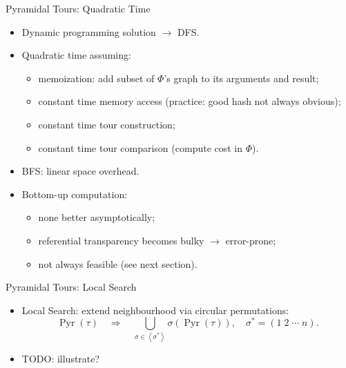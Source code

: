 \documentclass[
  size=10pt,
  style=klope,
  paper=screen,
  pauseslide,
  nopagebreaks,
  fleqn
]{powerdot}
\def\todo{\color{red}}
\def\eqitspace{\vspace{-5mm}}
\begin{document}
\begin{slide}[toc=Dynamic Programming${,}$ Recursion and Time Complexity]{Pyramidal Tours: Quadratic Time}
  \begin{itemize}
  \item
  Dynamic programming solution $\rightarrow$ DFS.
  \item
  Quadratic time assuming:
  \begin{itemize}
    \item memoization: add subset of $\Phi$'s graph to its arguments and result;
    \item constant time memory access (practice: good hash not always obvious);
    \item constant time tour construction;
    \item constant time tour comparison (compute cost in $\Phi$).
  \end{itemize}
  \item
  BFS: linear space overhead.
  \item
  Bottom-up computation:
  \begin{itemize}
    \item
    none better asymptotically;
    \item
    referential transparency becomes bulky $\rightarrow$ error-prone;
    \item
    not always feasible (see next section).
  \end{itemize}
  \end{itemize}
\end{slide}

\begin{slide}[toc=]{Pyramidal Tours: Local Search}
  \begin{itemize}
  \item
    Local Search: extend neighbourhood via circular permutations:
    \begin{equation}
      \operatorname{Pyr}\left(\tau\right)
      \quad \Rightarrow \quad
      \bigcup_{\sigma \in \left<\sigma^\ast\right>}\sigma\left(\operatorname{Pyr}\left(\tau\right)\right),
      \quad \sigma^\ast = \left(1\;2\;\cdots\;n\right).
    \end{equation}
  \eqitspace
  \item
  {\todo TODO:} illustrate?
  \end{itemize}
\end{slide}
\end{document}
